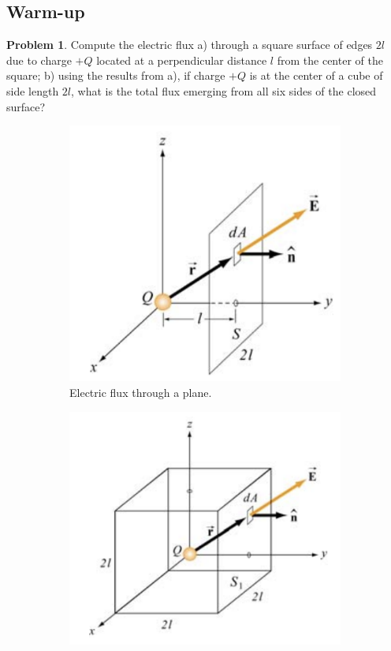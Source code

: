 \documentclass[11pt, letterpaper]{article}
\begin{document}
	\subsection{Warm-up}
	\textbf{Problem 1}. Compute the electric flux a) through a square surface of edges $2l$ due to 
	charge $+Q$ located at a perpendicular distance $l$ from the center of the square; b) using the
	results from a), if charge $+Q$ is at the center of a cube of side length $2l$, what is the total
	flux emerging from all six sides of the closed surface?
	\begin{figure}[h!]
		\centering 
		\begin{subfigure}[b]{0.3\textwidth}
			\centering
			\includegraphics[width=\textwidth]{plane}
			\caption{Electric flux through a plane.}
		\end{subfigure}
		\hspace{2cm}
		\begin{subfigure}[b]{0.3\textwidth}
	    		\centering
			\includegraphics[width=\textwidth]{cube}

\end{subfigure}
\end{figure}
\end{document}
